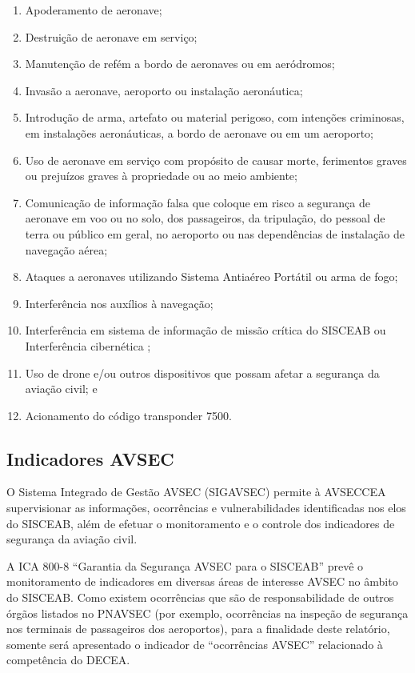 \documentclass[
]{book}
\begin{document}
\begin{enumerate}
\def\labelenumi{\alph{enumi})}
\item
  Apoderamento de aeronave;
\item
  Destruição de aeronave em serviço;
\item
  Manutenção de refém a bordo de aeronaves ou em aeródromos;
\item
  Invasão a aeronave, aeroporto ou instalação aeronáutica;
\item
  Introdução de arma, artefato ou material perigoso, com intenções criminosas, em instalações aeronáuticas, a bordo de aeronave ou em um aeroporto;
\item
  Uso de aeronave em serviço com propósito de causar morte, ferimentos graves ou prejuízos graves à propriedade ou ao meio ambiente;
\item
  Comunicação de informação falsa que coloque em risco a segurança de aeronave em voo ou no solo, dos passageiros, da tripulação, do pessoal de terra ou público em geral, no aeroporto ou nas dependências de instalação de navegação aérea;
\item
  Ataques a aeronaves utilizando Sistema Antiaéreo Portátil ou arma de fogo;
\item
  Interferência nos auxílios à navegação;
\item
  Interferência em sistema de informação de missão crítica do SISCEAB ou Interferência cibernética ;
\item
  Uso de drone e/ou outros dispositivos que possam afetar a segurança da aviação civil; e
\item
  Acionamento do código transponder 7500.
\end{enumerate}

\hypertarget{indicadores-avsec}{%
\subsection{Indicadores AVSEC}\label{indicadores-avsec}}

O Sistema Integrado de Gestão AVSEC (SIGAVSEC) permite à AVSECCEA supervisionar as informações, ocorrências e vulnerabilidades identificadas nos elos do SISCEAB, além de efetuar o monitoramento e o controle dos indicadores de segurança da aviação civil.

A ICA 800-8 ``Garantia da Segurança AVSEC para o SISCEAB'' prevê o monitoramento de indicadores em diversas áreas de interesse AVSEC no âmbito do SISCEAB. Como existem ocorrências que são de responsabilidade de outros órgãos listados no PNAVSEC (por exemplo, ocorrências na inspeção de segurança nos terminais de passageiros dos aeroportos), para a finalidade deste relatório, somente será apresentado o indicador de ``ocorrências AVSEC'' relacionado à competência do DECEA.
\end{document}
